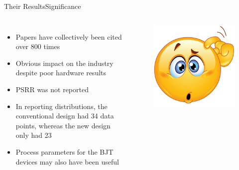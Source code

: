 \documentclass[aspectratio=1610]{beamer} %
\begin{document}
\begin{frame}{Their Results}{Significance}

    \begin{columns}[c]
        \begin{itemize}
            \item Papers have collectively been cited over 800 times
            \item Obvious impact on the industry despite poor hardware results
            \item PSRR was not reported
            \item In reporting distributions, the conventional design had 34 data points, whereas the new design only had 23
            \item Process parameters for the BJT devices may also have been useful
        \end{itemize}
    
        \begin{figure}
            \includegraphics[height=0.4\columnwidth]{hmm.png}            
        \end{figure}
    \end{columns}
\end{frame}
\end{document}
